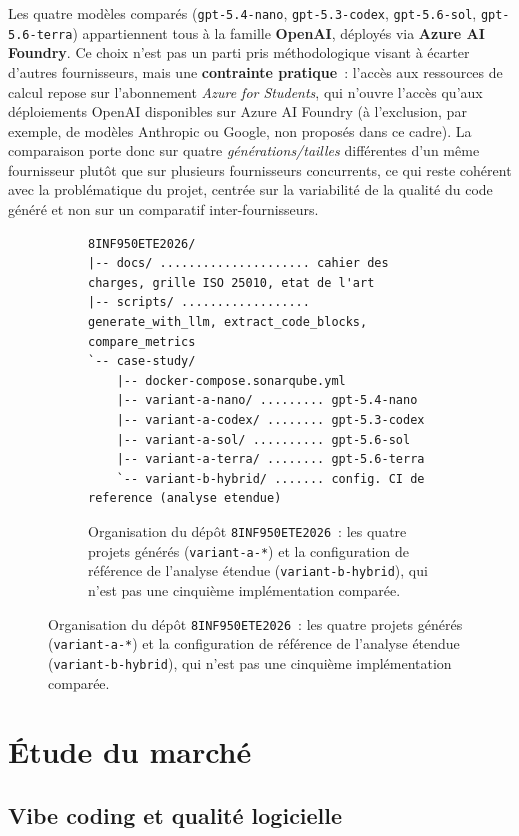 \documentclass[12pt, a4paper]{article}
\begin{document}
Les quatre modèles comparés (\texttt{gpt-5.4-nano}, \texttt{gpt-5.3-codex},
\texttt{gpt-5.6-sol}, \texttt{gpt-5.6-terra}) appartiennent tous à la famille
\textbf{OpenAI}, déployés via \textbf{Azure AI Foundry}. Ce choix n'est pas un parti pris
méthodologique visant à écarter d'autres fournisseurs, mais une \textbf{contrainte
pratique}~: l'accès aux ressources de calcul repose sur l'abonnement
\emph{Azure for Students}, qui n'ouvre l'accès qu'aux déploiements OpenAI disponibles sur
Azure AI Foundry (à l'exclusion, par exemple, de modèles Anthropic ou Google, non proposés
dans ce cadre). La comparaison porte donc sur quatre \emph{générations/tailles} différentes
d'un même fournisseur plutôt que sur plusieurs fournisseurs concurrents, ce qui reste
cohérent avec la problématique du projet, centrée sur la variabilité de la qualité du code
généré et non sur un comparatif inter-fournisseurs.

\begin{figure}[H]
    \centering
    \begin{figure}[H]
    \centering
    \begin{lstlisting}[basicstyle=\ttfamily\scriptsize, frame=single, backgroundcolor=\color{gray!8}]
8INF950ETE2026/
|-- docs/ ..................... cahier des charges, grille ISO 25010, etat de l'art
|-- scripts/ .................. generate_with_llm, extract_code_blocks, compare_metrics
`-- case-study/
    |-- docker-compose.sonarqube.yml
    |-- variant-a-nano/ ......... gpt-5.4-nano 
    |-- variant-a-codex/ ........ gpt-5.3-codex
    |-- variant-a-sol/ .......... gpt-5.6-sol
    |-- variant-a-terra/ ........ gpt-5.6-terra
    `-- variant-b-hybrid/ ....... config. CI de reference (analyse etendue)
    \end{lstlisting}
    \caption{Organisation du dépôt \texttt{8INF950ETE2026}~: les quatre projets générés
    (\texttt{variant-a-*}) et la configuration de référence de l'analyse étendue
    (\texttt{variant-b-hybrid}), qui n'est pas une cinquième implémentation comparée.}
    \label{fig:repo-overview}
\end{figure}
\end{figure}

\section{Étude du marché}
\label{sec:etude-marche}

\subsection{Vibe coding et qualité logicielle}
\end{document}
